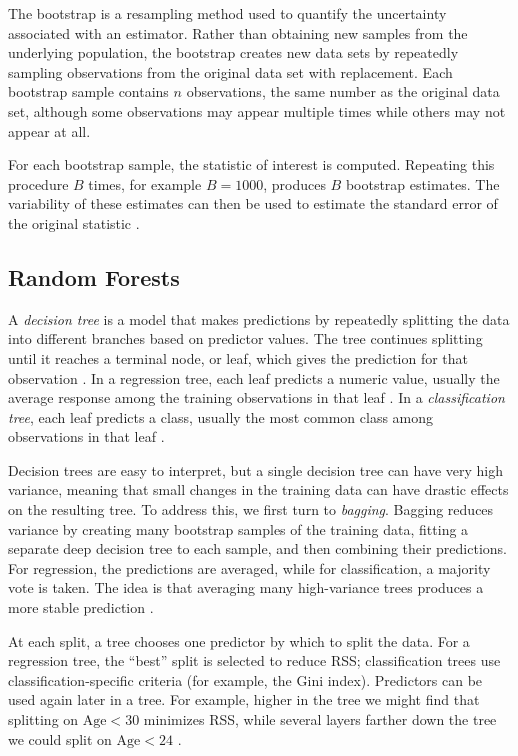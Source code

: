 \documentclass[11pt,letterpaper,reqno]{amsart}
\numberwithin{equation}{subsection}
\theoremstyle{definition}
\numberwithin{thm}{subsection}
\begin{document}
The bootstrap is a resampling method used to quantify the uncertainty associated with an estimator. Rather than obtaining new samples from the underlying population, the bootstrap creates new data sets by repeatedly sampling observations from the original data set with replacement. Each bootstrap sample contains $n$ observations, the same number as the original data set, although some observations may appear multiple times while others may not appear at all.

For each bootstrap sample, the statistic of interest is computed. Repeating this procedure $B$ times, for example $B=1000$, produces $B$ bootstrap estimates. The variability of these estimates can then be used to estimate the standard error of the original statistic \cite[Section 5.2, pp. 212--214]{James:2023}.

\subsection{Random Forests}
\label{sec:random_forest_theory}
A \textit{decision tree} is a model that makes predictions by repeatedly splitting the data into different branches based on predictor values. The tree continues splitting until it reaches a terminal node, or leaf, which gives the prediction for that observation \cite[Section 8.1, pp. 331--332]{James:2023}. In a regression tree, each leaf predicts a numeric value, usually the average response among the training observations in that leaf \cite[Section 8.1.1, p. 332]{James:2023}. In a \textit{classification tree}, each leaf predicts a class, usually the most common class among observations in that leaf \cite[Section 8.1.2, p. 337]{James:2023}.

Decision trees are easy to interpret, but a single decision tree can have very high variance, meaning that small changes in the training data can have drastic effects on the resulting tree. To address this, we first turn to \textit{bagging}. Bagging reduces variance by creating many bootstrap samples of the training data, fitting a separate deep decision tree to each sample, and then combining their predictions. For regression, the predictions are averaged, while for classification, a majority vote is taken. The idea is that averaging many high-variance trees produces a more stable prediction \cite[Section 8.2.1, pp. 343--345]{James:2023}.

At each split, a tree chooses one predictor by which to split the data. For a regression tree, the ``best'' split is selected to reduce RSS; classification trees use classification-specific criteria (for example, the Gini index). Predictors can be used again later in a tree. For example, higher in the tree we might find that splitting on $\text{Age}<30$ minimizes RSS, while several layers farther down the tree we could split on $\text{Age}<24$ \cite[Sections 8.1.1--8.1.2, pp. 331--341]{James:2023}.
\end{document}

